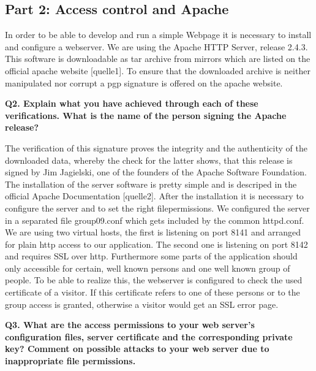 \subsection {Part 2: Access control and Apache}


\noindent
In order to be able to develop and run a simple Webpage it is necessary to install and configure a webserver. 
We are using  the Apache HTTP Server, release 2.4.3. This software is downloadable as tar archive from mirrors 
which are listed on the official apache website [quelle1]. To ensure that the downloaded archive is neither manipulated 
nor corrupt a pgp signature is offered on the apache website. 
\newline

\noindent
{\bf Q2. Explain what you have achieved through each of these verifications.
What is the name of the person signing the Apache release?}
\newline

\noindent
The verification of this signature proves the integrity and the authenticity of the downloaded data, 
whereby the check for the latter shows, that this release is signed by Jim Jagielski, 
one of the founders of the Apache Software Foundation. 
\newline
\noindent
The installation of the server software is pretty simple and is descriped in the official Apache Documentation [quelle2].
After the installation it is necessary to configure the server and to set the right filepermissions. 
We configured the server in a separated file group09.conf which gets included by the common httpd.conf. 
We are using two virtual hosts, the first is listening on port 8141 and arranged for plain http access to our application.
The second one is listening on port 8142 and requires SSL over http. 
Furthermore some parts of the application should only accessible for certain, 
well known persons and one well known group of people. To be able to realize this, 
the webserver is configured to check the used certificate of a visitor. 
If this certificate refers to one of these persons or to the group access is granted, 
otherwise a visitor would get an SSL error page. 
\newline

\noindent
{\bf Q3. What are the access permissions to your web server’s configuration files,
server certificate and the corresponding private key? Comment on possible
attacks to your web server due to inappropriate file permissions.}
\newline

